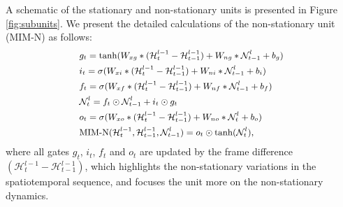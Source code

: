 \documentclass[10pt,twocolumn,letterpaper]{article}
\begin{document}

A schematic of the stationary and non-stationary units is presented in Figure \ref{fig:subunits}. We present the detailed calculations of the non-stationary unit (MIM-N) as follows:
\begin{equation}\label{equ:stationary}
  \small
  \begin{split}
  & g_t = \tanh(W_{xg} \ast (\mathcal{H}_t^{l-1} - \mathcal{H}_{t-1}^{l-1}) + W_{ng} \ast \mathcal{N}_{t-1}^l + b_g) \\
  & i_t = \sigma(W_{xi} \ast (\mathcal{H}_t^{l-1} - \mathcal{H}_{t-1}^{l-1}) + W_{ni} \ast \mathcal{N}_{t-1}^l + b_i)\\
  & f_t = \sigma(W_{xf} \ast (\mathcal{H}_t^{l-1} - \mathcal{H}_{t-1}^{l-1}) + W_{nf} \ast \mathcal{N}_{t-1}^l + b_f) \\
  & \mathcal{N}_t^l = f_t \odot \mathcal{N}_{t-1}^l + i_t \odot g_t \\
  & o_t = \sigma(W_{xo} \ast (\mathcal{H}_t^{l-1} - \mathcal{H}_{t-1}^{l-1}) + W_{no} \ast \mathcal{N}_t^l + b_o) \\ 
  & \text{MIM-N}(\mathcal{H}_t^{l-1}, \mathcal{H}_{t-1}^{l-1}, \mathcal{N}_{t-1}^l) = o_t \odot \tanh(\mathcal{N}_t^l),\\
  \end{split}
\end{equation}
where all gates $g_t$, $i_t$, $f_t$ and $o_t$ are updated by the frame difference $(\mathcal{H}_t^{l-1} - \mathcal{H}_{t-1}^{l-1})$, which highlights the non-stationary variations in the spatiotemporal sequence, and focuses the unit more on the non-stationary dynamics.
\end{document}
